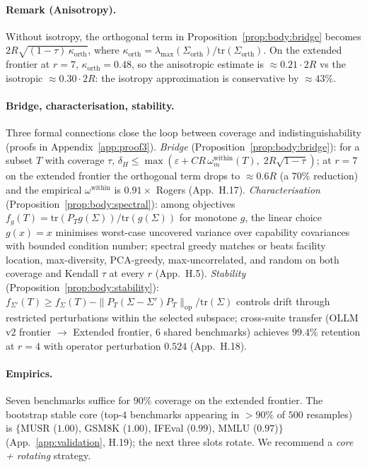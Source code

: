 \documentclass{article}
\begin{document}
\paragraph{Remark (Anisotropy).} Without isotropy, the orthogonal
term in Proposition~\ref{prop:body:bridge} becomes
$2R\sqrt{(1-\tau)\,\kappa_{\mathrm{orth}}}$, where
$\kappa_{\mathrm{orth}} = \lambda_{\max}(\Sigma_{\mathrm{orth}}) /
\mathrm{tr}(\Sigma_{\mathrm{orth}})$. On the extended frontier at
$r = 7$, $\kappa_{\mathrm{orth}} = 0.48$, so the anisotropic estimate
is $\approx 0.21 \cdot 2R$ vs the isotropic $\approx 0.30 \cdot 2R$:
the isotropy approximation is conservative by $\approx 43\%$.

\paragraph{Bridge, characterisation, stability.}
Three formal connections close the loop between coverage and
indistinguishability (proofs in Appendix~\ref{app:proof3}). \emph{Bridge}
(Proposition~\ref{prop:body:bridge}): for a subset $T$ with coverage
$\tau$, $\delta_H \le \max(\varepsilon + C R\,\omega_m^{\mathrm{within}}(T),
\;2R\sqrt{1-\tau})$; at $r = 7$ on the extended frontier the orthogonal
term drops to $\approx 0.6R$ (a $70\%$ reduction) and the empirical
$\omega^{\mathrm{within}}$ is $0.91\times$ Rogers (App.~H.17).
\emph{Characterisation} (Proposition~\ref{prop:body:spectral}):
among objectives $f_g(T) = \mathrm{tr}(P_T g(\Sigma))/\mathrm{tr}(g(\Sigma))$
for monotone $g$, the linear choice $g(x) = x$ minimises worst-case
uncovered variance over capability covariances with bounded condition
number; spectral greedy matches or beats facility location,
max-diversity, PCA-greedy, max-uncorrelated, and random on both
coverage and Kendall $\tau$ at every $r$ (App.~H.5).
\emph{Stability} (Proposition~\ref{prop:body:stability}):
$f_{\Sigma'}(T) \ge f_\Sigma(T) - \|P_T(\Sigma - \Sigma')P_T\|_{\mathrm{op}}
/ \mathrm{tr}(\Sigma)$ controls drift through restricted perturbations
within the selected subspace; cross-suite transfer (OLLM v2 frontier
$\to$ Extended frontier, $6$ shared benchmarks) achieves $99.4\%$
retention at $r = 4$ with operator perturbation $0.524$ (App.~H.18).

\paragraph{Empirics.} Seven benchmarks suffice for $90\%$ coverage on
the extended frontier. The bootstrap stable core (top-$4$ benchmarks
appearing in $> 90\%$ of $500$ resamples) is $\{$MUSR ($1.00$), GSM8K
($1.00$), IFEval ($0.99$), MMLU ($0.97$)$\}$
(App.~\ref{app:validation}, H.19); the next three slots rotate. We
recommend a \emph{core + rotating} strategy.
\end{document}
